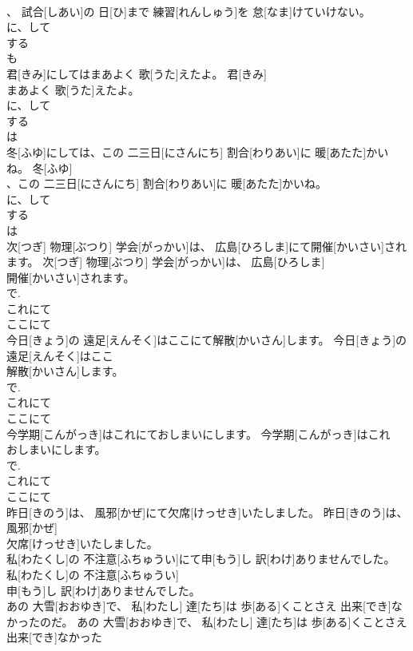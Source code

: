 \documentclass[8pt]{extreport}
\begin{document}
\begin{CJK}{UTF8}{min}
\\	、 試合[しあい]の 日[ひ]まで 練習[れんしゅう]を 怠[なま]けていけない。	
\\	に、して 
\\	する 
\\	も
\\	君[きみ]にしてはまあよく 歌[うた]えたよ。	君[きみ]
\\	まあよく 歌[うた]えたよ。	
\\	に、して 
\\	する 
\\	は 
\\	冬[ふゆ]にしては、この 二三日[にさんにち] 割合[わりあい]に 暖[あたた]かいね。	冬[ふゆ]
\\	、この 二三日[にさんにち] 割合[わりあい]に 暖[あたた]かいね。	
\\	に、して 
\\	する 
\\	は 
\\	次[つぎ] 物理[ぶつり] 学会[がっかい]は、 広島[ひろしま]にて開催[かいさい]されます。	次[つぎ] 物理[ぶつり] 学会[がっかい]は、 広島[ひろしま]
\\	開催[かいさい]されます。	
\\	で. 
\\	これにて 
\\	ここにて 
\\	今日[きょう]の 遠足[えんそく]はここにて解散[かいさん]します。	今日[きょう]の 遠足[えんそく]はここ
\\	解散[かいさん]します。	
\\	で. 
\\	これにて 
\\	ここにて 
\\	今学期[こんがっき]はこれにておしまいにします。	今学期[こんがっき]はこれ
\\	おしまいにします。	
\\	で. 
\\	これにて 
\\	ここにて 
\\	昨日[きのう]は、 風邪[かぜ]にて欠席[けっせき]いたしました。	昨日[きのう]は、 風邪[かぜ]
\\	欠席[けっせき]いたしました。	
\\	私[わたくし]の 不注意[ふちゅうい]にて申[もう]し 訳[わけ]ありませんでした。	私[わたくし]の 不注意[ふちゅうい]
\\	申[もう]し 訳[わけ]ありませんでした。	
\\	あの 大雪[おおゆき]で、 私[わたし] 達[たち]は 歩[ある]くことさえ 出来[でき]なかったのだ。	あの 大雪[おおゆき]で、 私[わたし] 達[たち]は 歩[ある]くことさえ 出来[でき]なかった

\end{CJK}
\end{document}
